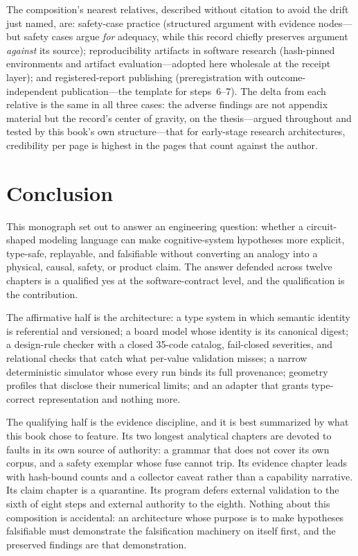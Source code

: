 The composition's nearest relatives, described without citation to avoid the drift just named, are: safety-case practice (structured argument with evidence nodes---but safety cases argue \emph{for} adequacy, while this record chiefly preserves argument \emph{against} its source); reproducibility artifacts in software research (hash-pinned environments and artifact evaluation---adopted here wholesale at the receipt layer); and registered-report publishing (preregistration with outcome-independent publication---the template for steps~6--7). The delta from each relative is the same in all three cases: the adverse findings are not appendix material but the record's center of gravity, on the thesis---argued throughout and tested by this book's own structure---that for early-stage research architectures, credibility per page is highest in the pages that count against the author.

\section{Conclusion}\label{ch12:conclusion}

This monograph set out to answer an engineering question: whether a circuit-shaped modeling language can make cognitive-system hypotheses more explicit, type-safe, replayable, and falsifiable without converting an analogy into a physical, causal, safety, or product claim. The answer defended across twelve chapters is a qualified yes at the software-contract level, and the qualification is the contribution.

The affirmative half is the architecture: a type system in which semantic identity is referential and versioned; a board model whose identity is its canonical digest; a design-rule checker with a closed 35-code catalog, fail-closed severities, and relational checks that catch what per-value validation misses; a narrow deterministic simulator whose every run binds its full provenance; geometry profiles that disclose their numerical limits; and an adapter that grants type-correct representation and nothing more.

The qualifying half is the evidence discipline, and it is best summarized by what this book chose to feature. Its two longest analytical chapters are devoted to faults in its own source of authority: a grammar that does not cover its own corpus, and a safety exemplar whose fuse cannot trip. Its evidence chapter leads with hash-bound counts and a collector caveat rather than a capability narrative. Its claim chapter is a quarantine. Its program defers external validation to the sixth of eight steps and external authority to the eighth. Nothing about this composition is accidental: an architecture whose purpose is to make hypotheses falsifiable must demonstrate the falsification machinery on itself first, and the preserved findings are that demonstration.


